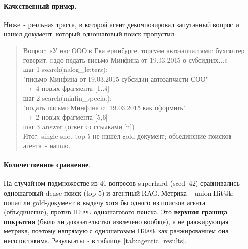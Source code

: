 \documentclass[a4paper,12pt]{article}
\begin{document}
\paragraph{Качественный пример.} Ниже~- реальная трасса, в которой агент декомпозировал запутанный вопрос и нашёл документ, который одношаговый поиск пропустил:

\begin{quote}\small\ttfamily
Вопрос: «У нас ООО в Екатеринбурге, торгуем автозапчастями; бухгалтер\\
говорит, надо подать письмо Минфина от 19.03.2015 о субсидиях...»\\[4pt]
шаг 1  search(nalog\_letters):\\
\hspace*{2em}"письмо Минфина от 19.03.2015 субсидии автозапчасти ООО"\\
\hspace*{2em}$\rightarrow$ 4 новых фрагмента [1..4]\\
шаг 2  search(minfin\_special):\\
\hspace*{2em}"подать письмо Минфина от 19.03.2015 как оформить"\\
\hspace*{2em}$\rightarrow$ 2 новых фрагмента [5,6]\\
шаг 3  answer (ответ со ссылками [n])\\[4pt]
Итог: single-shot top-5 не нашёл gold-документ; объединение поисков агента~- нашло.
\end{quote}

\paragraph{Количественное сравнение.} На случайном подмножестве из 40 вопросов superhard (seed~42) сравнивались одношаговый dense-поиск (top-5) и агентный RAG. Метрика~- union Hit@k: попал ли gold-документ в выдачу хотя бы одного из поисков агента (объединение), против Hit@k одношагового поиска. Это \textbf{верхняя граница покрытия} (было ли доказательство извлечено вообще), а не ранжирующая метрика, поэтому напрямую с одношаговым Hit@k как ранжированием она несопоставима. Результаты~- в таблице~\ref{tab:agentic_results}.

\begin{table}[H]
\centering
\caption{Агентный RAG vs одношаговый dense-поиск (40 вопросов superhard; колонки - критерии doc и strict)}
\label{tab:agentic_results}
\end{table}
\FloatBarrier
\end{document}
